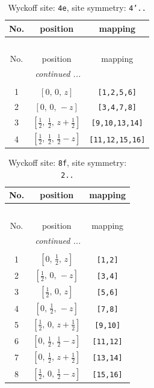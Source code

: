 \documentclass[fleqn,8pt]{jsarticle}
\begin{document}
\renewcommand{\arraystretch}{1.2}
\begin{longtable}{ccc}
\caption{Wyckoff site: {\tt 4e}, site symmetry: {\tt 4'..}}
 \\
 \hline \hline
No. & position & mapping \\ \hline \endfirsthead

\multicolumn{2}{l}{\tablename\ \thetable{}} \\
 \hline \hline
No. & position & mapping \\ \hline \endhead

 \hline \hline
\multicolumn{2}{r}{\footnotesize\it continued ...} \\ \endfoot

 \hline \hline
\multicolumn{2}{r}{} \\ \endlastfoot

1 & $\left[ 0,\, 0,\, z \right]$ & {\tt [1,2,5,6]} \\ \hline
2 & $\left[ 0,\, 0,\, - z \right]$ & {\tt [3,4,7,8]} \\ \hline
3 & $\left[ \frac{1}{2},\, \frac{1}{2},\, z + \frac{1}{2} \right]$ & {\tt [9,10,13,14]} \\ \hline
4 & $\left[ \frac{1}{2},\, \frac{1}{2},\, \frac{1}{2} - z \right]$ & {\tt [11,12,15,16]} \\
\end{longtable}
\renewcommand{\arraystretch}{1.2}
\begin{longtable}{ccc}
\caption{Wyckoff site: {\tt 8f}, site symmetry: {\tt 2..}}
 \\
 \hline \hline
No. & position & mapping \\ \hline \endfirsthead

\multicolumn{2}{l}{\tablename\ \thetable{}} \\
 \hline \hline
No. & position & mapping \\ \hline \endhead

 \hline \hline
\multicolumn{2}{r}{\footnotesize\it continued ...} \\ \endfoot

 \hline \hline
\multicolumn{2}{r}{} \\ \endlastfoot

1 & $\left[ 0,\, \frac{1}{2},\, z \right]$ & {\tt [1,2]} \\ \hline
2 & $\left[ \frac{1}{2},\, 0,\, - z \right]$ & {\tt [3,4]} \\ \hline
3 & $\left[ \frac{1}{2},\, 0,\, z \right]$ & {\tt [5,6]} \\ \hline
4 & $\left[ 0,\, \frac{1}{2},\, - z \right]$ & {\tt [7,8]} \\ \hline
5 & $\left[ \frac{1}{2},\, 0,\, z + \frac{1}{2} \right]$ & {\tt [9,10]} \\ \hline
6 & $\left[ 0,\, \frac{1}{2},\, \frac{1}{2} - z \right]$ & {\tt [11,12]} \\ \hline
7 & $\left[ 0,\, \frac{1}{2},\, z + \frac{1}{2} \right]$ & {\tt [13,14]} \\ \hline
8 & $\left[ \frac{1}{2},\, 0,\, \frac{1}{2} - z \right]$ & {\tt [15,16]} \\
\end{longtable}
\end{document}
